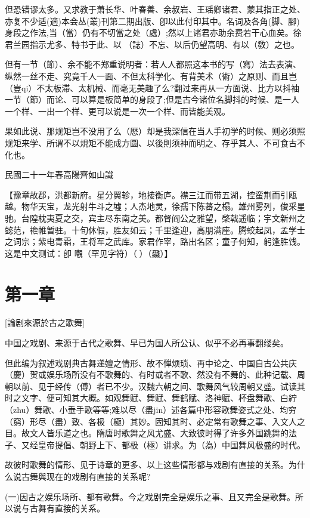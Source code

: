 \documentclass{zhvt-classic}
\begin{document}
但恐错谬太多。又求教于萧长华、叶春善、余叔岩、王瑶卿诸君、蒙其指正之处、亦复不少适(適)本会丛(叢)刊第二期出版、卽以此付印其中。名词及各角(脚、腳)身段之作法,当（當）仍有不切當之处（處）;然以上诸君亦助余费若干心血矣。徐君兰园指示尤多、特书于此、以𰵧（誌）不忘、以后仍望高明、有以（敎）之也。

但有一节（節）、余不能不郑重说明者：若人人都照这本书的写（寫）法去表演、纵然一丝不走、究竟千人一面、不但太科学化、有背美术（術）之原则、而且岂（豈qi）不太板滞、太机械、而毫无美趣了么?翻过来再从一方面说、比方以抖袖一节（節）而论、可以算是板简单的身段了;但是古今诸位名脚抖的时候、是一人一个样、一出一个样、更可以说是一次一个样、而皆能美观。

果如此说、那规矩岂不没用了么（厯）却是我深信在当人手初学的时候、则必须照规矩来学、所谓不以規矩不能成方圆、以後則须神而明之、存乎其人、不可食古不化也。

民國二十一年春高陽齊如山識

【豫章故郡，洪都新府。星分翼轸，地接衡庐。襟三江而带五湖，控蛮荆而引瓯越。物华天宝，龙光射牛斗之墟；人杰地灵，徐孺下陈蕃之榻。雄州雾列，俊采星驰。台隍枕夷夏之交，宾主尽东南之美。都督阎公之雅望，棨戟遥临；宇文新州之懿范，䄡帷暂驻。十旬休假，胜友如云；千里逢迎，高朋满座。腾蛟起凤，孟学士之词宗；紫电青霜，王将军之武库。家君作宰，路出名区；童子何知，躬逢胜饯。
这是中文测试：卽 𡃁（罕见字符）（𮸽）（飝）】

\chapter*[]{第一章}[論剧來源於古之歌舞]
\begin{preface}
中国之戏剧、来源于古代之歌舞、早已为国人所公认、似乎不必再事翻缕矣。
\end{preface}

但此编为叙述戏剧典古舞递嬗之情形、故不惮烦琐、再中论之、中国自古公共庆（慶）贺或娱乐场所没有不歌舞的、有时或者不歌、然没有不舞的、此种记载、周朝以前、见于经传（傅）者已不少。汉魏六朝之间、歌舞风气较周朝又盛。试读其时之文字、便可知其大概。如观舞赋、舞赋、舞鹤赋、洛神赋、杯盘舞歌、白紵（zhu）舞歌、小垂手歌等等;难以尽（盡jin）述各篇中形容歌舞姿式之处、均穷（窮）形尽（盡）致、各极（極）其妙。固知其时、必定常有歌舞之事、入文人之目。故文人皆乐道之也。隋唐时歌舞之风尤盛、大致彼时得了许多外国跳舞的法子、又经皇帝提倡、朝野上下、都极（極）讲求。为（為）中国舞风极盛的时代。

故彼时歌舞的情形、见于诗章的更多、以上这些情形都与戏剧有直接的关系。为什么说古舞與现在的戏剧有直接的关系呢?

(一)因古之娱乐场所、都有歌舞。今之戏剧完全是娱乐之事、且又完全是歌舞。所以说与古舞有直接的关系。
\end{document}
